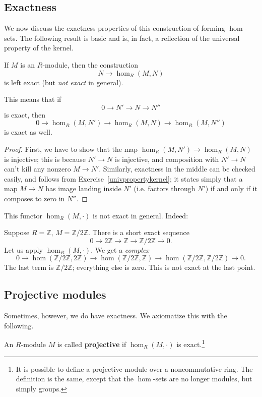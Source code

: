 \subsection{Exactness}

We now discuss the exactness properties of this construction of forming
$\hom$-sets. The following result is basic and is, in fact, a reflection of
the universal property of the kernel.
\begin{proposition} 
If $M$ is an $R$-module, then the construction
\[ N \to \hom_R(M,N)  \]
is left exact (but \emph{not exact} in general). 
\end{proposition} 
This means that if 
\[ 0 \to N' \to N \to N''  \]
is exact,
then 
\[ 0 \to \hom_R(M, N') \to \hom_R(M, N) \to \hom_R(M, N'')  \]
is exact as well. 

\begin{proof} 
 First, we have to show that the map
$\hom_R(M,N') \to \hom_R(M,N)$ is injective; this is because $N' \to N$ is
injective, and composition with $N' \to N$ can't kill any nonzero $M \to N'$. 
Similarly, exactness in the middle can be checked easily, and follows from
Exercise~\ref{univpropertykernel}; it states simply that a map $M \to N$ has
image landing inside $N'$ (i.e. factors through $N'$) if and only if it
composes to zero in $N''$. 
\end{proof}

This functor $\hom_R(M, \cdot)$  is not exact in general.  Indeed:
\begin{example} 
Suppose $R = \mathbb{Z}$, $M = \mathbb{Z}/2\mathbb{Z}$. There is a short exact
sequence
\[ 0 \to 2\mathbb{Z} \to \mathbb{Z} \to \mathbb{Z}/2\mathbb{Z} \to 0.  \]
Let us apply $\hom_R(M, \cdot)$. We get a \emph{complex}
\[ 0 \to \hom(\mathbb{Z}/2\mathbb{Z}, 2\mathbb{Z}) \to
\hom(\mathbb{Z}/2\mathbb{Z}, \mathbb{Z}) \to \hom(\mathbb{Z}/2\mathbb{Z},
\mathbb{Z}/2\mathbb{Z}) \to 0.  \]
The last term is $\mathbb{Z}/2\mathbb{Z}$; everything else is zero. This is not
exact at the last point. 
\end{example} 

\subsection{Projective modules}

Sometimes, however, we do have exactness. We axiomatize this with the following.

\begin{definition} 
An $R$-module $M$ is called \textbf{projective} if $\hom_R(M, \cdot)$ is
exact.\footnote{It is possible to define a projective module over a
noncommutative ring. The definition is the same, except that the $\hom$-sets
are no longer modules, but simply groups. }
\end{definition} 

